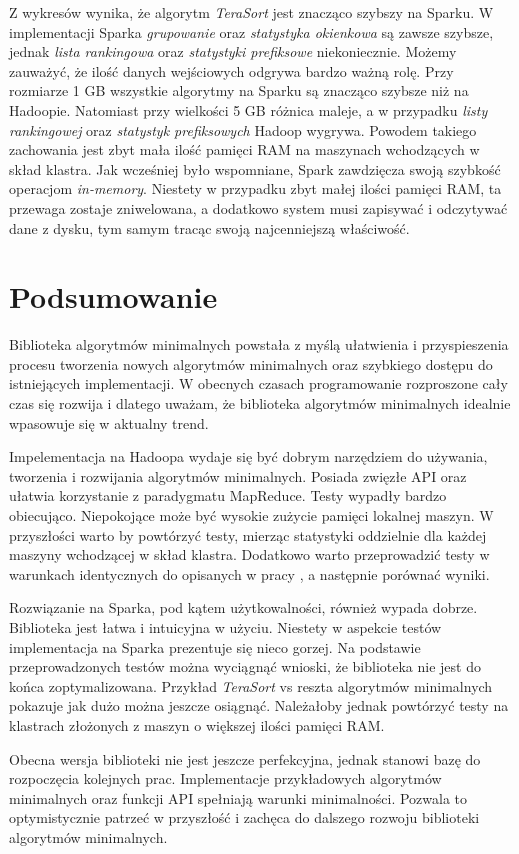 \documentclass[licencjacka]{pracamgr}
\begin{document}
Z wykresów wynika, że algorytm \textit{TeraSort} jest znacząco szybszy na Sparku. W implementacji Sparka \textit{grupowanie} oraz \textit{statystyka okienkowa} są zawsze szybsze, jednak \textit{lista rankingowa} oraz \textit{statystyki prefiksowe} niekoniecznie. Możemy zauważyć, że ilość danych wejściowych odgrywa bardzo ważną rolę. Przy rozmiarze 1 GB wszystkie algorytmy na Sparku są znacząco szybsze niż na Hadoopie. Natomiast przy wielkości 5 GB różnica maleje, a w przypadku \textit{listy rankingowej} oraz \textit{statystyk prefiksowych} Hadoop wygrywa. Powodem takiego zachowania jest zbyt mała ilość pamięci RAM na maszynach wchodzących w skład klastra. Jak wcześniej było wspomniane, Spark zawdzięcza swoją szybkość operacjom \textit{in-memory}. Niestety w przypadku zbyt małej ilości pamięci RAM, ta przewaga zostaje zniwelowana, a dodatkowo system musi zapisywać i odczytywać dane z dysku, tym samym tracąc swoją najcenniejszą właściwość.

\chapter{Podsumowanie}

Biblioteka algorytmów minimalnych powstała z myślą ułatwienia i przyspieszenia procesu tworzenia nowych algorytmów minimalnych oraz szybkiego dostępu do istniejących implementacji. W obecnych czasach programowanie rozproszone cały czas się rozwija i dlatego uważam, że biblioteka algorytmów minimalnych idealnie wpasowuje się w aktualny trend.

Impelementacja na Hadoopa wydaje się być dobrym narzędziem do używania, tworzenia i rozwijania algorytmów minimalnych. Posiada zwięzłe API oraz ułatwia korzystanie z paradygmatu MapReduce. Testy wypadły bardzo obiecująco. Niepokojące może być wysokie zużycie pamięci lokalnej maszyn. W przyszłości warto by powtórzyć testy, mierząc statystyki oddzielnie dla każdej maszyny wchodzącej w skład klastra. Dodatkowo warto przeprowadzić testy w warunkach identycznych do opisanych w pracy \cite{tao2013minimal}, a następnie porównać wyniki.

Rozwiązanie na Sparka, pod kątem użytkowalności, również wypada dobrze. Biblioteka jest łatwa i intuicyjna w użyciu. Niestety w aspekcie testów implementacja na Sparka prezentuje się nieco gorzej. Na podstawie przeprowadzonych testów można wyciągnąć wnioski, że biblioteka nie jest do końca zoptymalizowana. Przykład \textit{TeraSort} vs reszta algorytmów minimalnych pokazuje jak dużo można jeszcze osiągnąć. Należałoby jednak powtórzyć testy na klastrach złożonych z maszyn o większej ilości pamięci RAM.

Obecna wersja biblioteki nie jest jeszcze perfekcyjna, jednak stanowi bazę do rozpoczęcia kolejnych prac. Implementacje przykładowych algorytmów minimalnych oraz funkcji API spełniają warunki minimalności. Pozwala to optymistycznie patrzeć w przyszłość i zachęca do dalszego rozwoju biblioteki algorytmów minimalnych.



\end{document}
